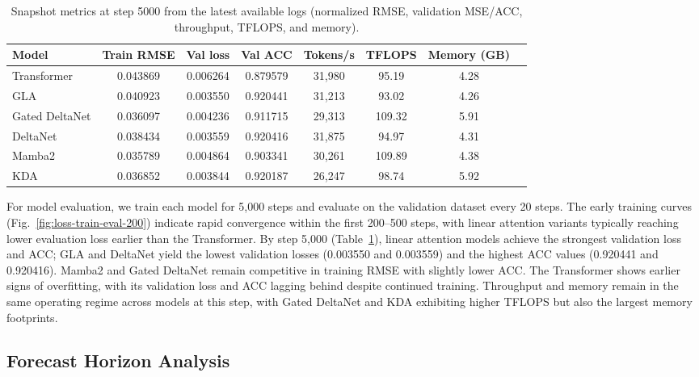 \documentclass[runningheads]{llncs}
\begin{document}
\begin{table}[t]
    \centering
    \caption{Snapshot metrics at step 5000 from the latest available logs (normalized RMSE, validation MSE/ACC, throughput, TFLOPS, and memory).}
    \label{tab:main_results_step5000}
    \begin{tabular}{lccccccc}
        \toprule
        \textbf{Model} & \textbf{Train RMSE} & \textbf{Val loss} & \textbf{Val ACC} & \textbf{Tokens/s} & \textbf{TFLOPS} & \textbf{Memory (GB)} \\
        \midrule
        Transformer & 0.043869 & 0.006264 & 0.879579 & 31,980 & 95.19 & 4.28 \\
        GLA & 0.040923 & 0.003550 & 0.920441 & 31,213 & 93.02 & 4.26 \\
        Gated DeltaNet & 0.036097 & 0.004236 & 0.911715 & 29,313 & 109.32 & 5.91 \\
        DeltaNet & 0.038434 & 0.003559 & 0.920416 & 31,875 & 94.97 & 4.31 \\
        Mamba2 & 0.035789 & 0.004864 & 0.903341 & 30,261 & 109.89 & 4.38 \\
        KDA & 0.036852 & 0.003844 & 0.920187 & 26,247 & 98.74 & 5.92 \\
        \bottomrule
    \end{tabular}
\end{table}

For model evaluation, we train each model for 5,000 steps and evaluate on the validation dataset every 20 steps. The early training curves (Fig.~\ref{fig:loss-train-eval-200}) indicate rapid convergence within the first 200--500 steps, with linear attention variants typically reaching lower evaluation loss earlier than the Transformer. By step 5,000 (Table~\ref{tab:main_results_step5000}), linear attention models achieve the strongest validation loss and ACC; GLA and DeltaNet yield the lowest validation losses (0.003550 and 0.003559) and the highest ACC values (0.920441 and 0.920416). Mamba2 and Gated DeltaNet remain competitive in training RMSE with slightly lower ACC. The Transformer shows earlier signs of overfitting, with its validation loss and ACC lagging behind despite continued training. Throughput and memory remain in the same operating regime across models at this step, with Gated DeltaNet and KDA exhibiting higher TFLOPS but also the largest memory footprints.

\subsection{Forecast Horizon Analysis}
\end{document}
